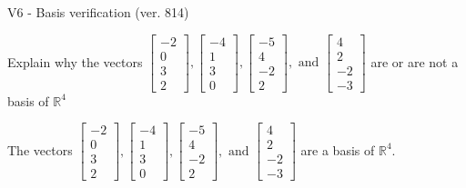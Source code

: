 \begin{exercise}
  \begin{exerciseTitle}V6 - Basis verification (ver. 814)\end{exerciseTitle}
  \begin{exerciseStatement}
    Explain why the vectors \(\left[\begin{array}{r}
-2 \\
0 \\
3 \\
2
\end{array}\right] , \left[\begin{array}{r}
-4 \\
1 \\
3 \\
0
\end{array}\right] , \left[\begin{array}{r}
-5 \\
4 \\
-2 \\
2
\end{array}\right] , \text{ and } \left[\begin{array}{r}
4 \\
2 \\
-2 \\
-3
\end{array}\right]\) are or are not a basis of \(\mathbb{R}^4\)	


  \end{exerciseStatement}
  \begin{exerciseAnswer}
   The vectors \(\left[\begin{array}{r}
-2 \\
0 \\
3 \\
2
\end{array}\right] , \left[\begin{array}{r}
-4 \\
1 \\
3 \\
0
\end{array}\right] , \left[\begin{array}{r}
-5 \\
4 \\
-2 \\
2
\end{array}\right] , \text{ and } \left[\begin{array}{r}
4 \\
2 \\
-2 \\
-3
\end{array}\right]\) 
  	 are  a basis of \(\mathbb{R}^4\).
  


  \end{exerciseAnswer}
\end{exercise}